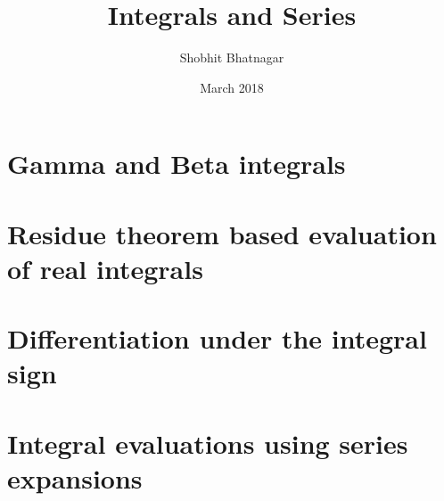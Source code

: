 \documentclass{book}[12pt]
\title{Integrals and Series}
\author{Shobhit Bhatnagar}
\date{March 2018}
\begin{document}
	\maketitle
	\tableofcontents
	\chapter{Gamma and Beta integrals}
	
	\chapter{Residue theorem based evaluation of real integrals}
	
	\chapter{Differentiation under the integral sign}
	
	\chapter{Integral evaluations using series expansions}
	
\end{document}
